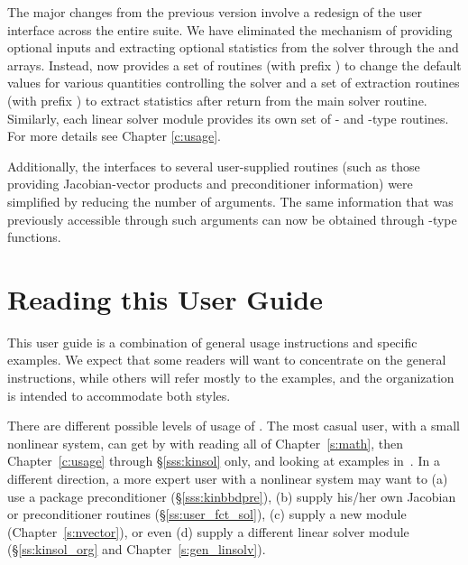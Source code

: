 The major changes from the previous version involve a redesign of
the user interface across the entire {\sundials} suite. We have
eliminated the mechanism of providing optional inputs and
extracting optional statistics from the solver through the
 and  arrays. Instead, {\kinsol} now provides a
set of routines (with prefix ) to change the default
values for various quantities controlling the solver and a set of
extraction routines (with prefix ) to extract
statistics after return from the main solver routine. Similarly,
each linear solver module provides its own set of {-} and
{-type} routines. For more details see Chapter \ref{c:usage}.

Additionally, the interfaces to several user-supplied routines
(such as those providing Jacobian-vector products and
preconditioner information) were simplified by reducing the number
of arguments. The same information that was previously accessible
through such arguments can now be obtained through {-type}
functions.

\section{Reading this User Guide}\label{ss:reading}

This user guide is a combination of general usage instructions and specific
examples. We expect that some readers will want to concentrate on the general
instructions, while others will refer mostly to the examples, and the
organization is intended to accommodate both styles.

There are different possible levels of usage of {\kinsol}. The most casual
user, with a small nonlinear system, can get by with reading all of 
Chapter~\ref{s:math}, then Chapter~\ref{c:usage} through \S\ref{sss:kinsol} only, and
looking at examples in~\cite{kinsol_ex}. In a different direction, a
more expert user with a nonlinear system may want to (a) use a package
preconditioner (\S\ref{sss:kinbbdpre}), (b) supply his/her own Jacobian or
preconditioner routines (\S\ref{ss:user_fct_sol}), (c) supply a new
{\nvector} module (Chapter~\ref{s:nvector}), or even (d) supply a different
linear solver module (\S\ref{ss:kinsol_org} and Chapter~\ref{s:gen_linsolv}).

